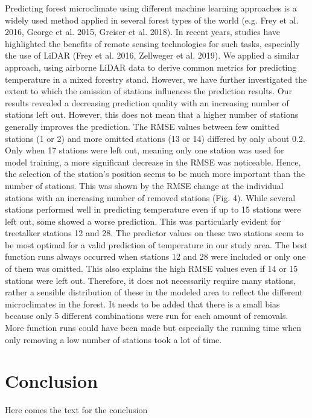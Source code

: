 \documentclass[5p]{elsarticle} %
\begin{document}
Predicting forest microclimate using different machine learning approaches is a widely used method applied in several forest types of the world (e.g. Frey et al. 2016, George et al. 2015, Greiser et al. 2018). In recent years, studies have highlighted the benefits of remote sensing technologies for such tasks, especially the use of LiDAR (Frey et al. 2016, Zellweger et al. 2019). We applied a similar approach, using airborne LiDAR data to derive common metrics for predicting temperature in a mixed forestry stand. However, we have further investigated the extent to which the omission of stations influences the prediction results.
Our results revealed a decreasing prediction quality with an increasing number of stations left out. However, this does not mean that a higher number of stations generally improves the prediction. The RMSE values between few omitted stations (1 or 2) and more omitted stations (13 or 14) differed by only about 0.2. Only when 17 stations were left out, meaning only one station was used for model training, a more significant decrease in the RMSE was noticeable. Hence, the selection of the station's position seems to be much more important than the number of stations. This was shown by the RMSE change at the individual stations with an increasing number of removed stations (Fig. 4). While several stations performed well in predicting temperature even if up to 15 stations were left out, some showed a worse prediction. This was particularly evident for treetalker stations 12 and 28. The predictor values on these two stations seem to be most optimal for a valid prediction of temperature in our study area. The best function runs always occurred when stations 12 and 28 were included or only one of them was omitted. This also explains the high RMSE values even if 14 or 15 stations were left out. Therefore, it does not necessarily require many stations, rather a sensible distribution of these in the modeled area to reflect the different microclimates in the forest. It needs to be added that there is a small bias because only 5 different combinations were run for each amount of removals. More function runs could have been made but especially the running time when only removing a low number of stations took a lot of time.


\hypertarget{conclusion}{%
\section{Conclusion}\label{conclusion}}

Here comes the text for the conclusion
\end{document}
